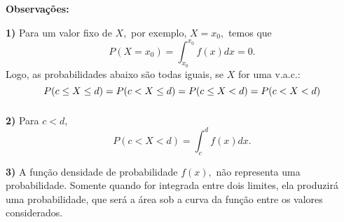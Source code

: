 \documentclass[14pt,aspectratio=1610]{beamer}
\begin{document}
\begin{frame}{}
\frametitle{}
\begin{block}{}
\justifying
\textbf{Observações:}

\textbf{1)} Para um valor fixo de $X,$ por exemplo, $X=x_{0},$ temos que $$\displaystyle P(X=x_{0})=\int_{x_{0}}^{x_{0}}f(x)dx=0.$$ Logo, as probabilidades abaixo são todas iguais, se $X$ for uma v.a.c.: 
$${\small P(c\leq X\leq d)=P(c< X\leq d)=P(c\leq X< d)=P(c< X< d)}$$
\end{block}
\end{frame}

\begin{frame}{}
\frametitle{}
\begin{block}{}
\justifying
\textbf{2)} Para $c<d,$ $$\displaystyle P(c<X<d)=\int_{c}^{d}f(x)dx.$$\pause

\textbf{3)} A função densidade de probabilidade $f(x),$ não representa uma pro\-ba\-bi\-li\-da\-de. Somente quando for integrada entre dois limites, ela produzirá uma pro\-ba\-bi\-li\-da\-de, que será a área sob a curva da função entre os valores considerados.
\end{block}
\end{frame}

\begin{frame}{}
\frametitle{}
\end{frame}
\end{document}
